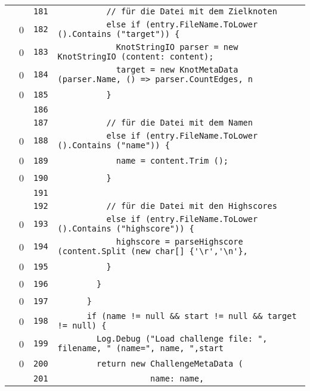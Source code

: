 \documentclass[a4paper,10pt]{article}
\begin{document}
\begin{longtable}[l]{lrrl}
\cellcolor{gray} &  & \verb~181~ & \verb~          // für die Datei mit dem Zielknoten~\\
\cellcolor{red} & 0 & \verb~182~ & \verb~          else if (entry.FileName.ToLower ().Contains ("target")) {~\\
\cellcolor{red} & 0 & \verb~183~ & \verb~            KnotStringIO parser = new KnotStringIO (content: content);~\\
\cellcolor{red} & 0 & \verb~184~ & \verb~            target = new KnotMetaData (parser.Name, () => parser.CountEdges, n~\\
\cellcolor{red} & 0 & \verb~185~ & \verb~          }~\\
\cellcolor{gray} &  & \verb~186~ & \verb~~\\
\cellcolor{gray} &  & \verb~187~ & \verb~          // für die Datei mit dem Namen~\\
\cellcolor{red} & 0 & \verb~188~ & \verb~          else if (entry.FileName.ToLower ().Contains ("name")) {~\\
\cellcolor{red} & 0 & \verb~189~ & \verb~            name = content.Trim ();~\\
\cellcolor{red} & 0 & \verb~190~ & \verb~          }~\\
\cellcolor{gray} &  & \verb~191~ & \verb~~\\
\cellcolor{gray} &  & \verb~192~ & \verb~          // für die Datei mit den Highscores~\\
\cellcolor{red} & 0 & \verb~193~ & \verb~          else if (entry.FileName.ToLower ().Contains ("highscore")) {~\\
\cellcolor{red} & 0 & \verb~194~ & \verb~            highscore = parseHighscore (content.Split (new char[] {'\r','\n'},~\\
\cellcolor{red} & 0 & \verb~195~ & \verb~          }~\\
\cellcolor{red} & 0 & \verb~196~ & \verb~        }~\\
\cellcolor{red} & 0 & \verb~197~ & \verb~      }~\\
\cellcolor{red} & 0 & \verb~198~ & \verb~      if (name != null && start != null && target != null) {~\\
\cellcolor{red} & 0 & \verb~199~ & \verb~        Log.Debug ("Load challenge file: ", filename, " (name=", name, ",start~\\
\cellcolor{red} & 0 & \verb~200~ & \verb~        return new ChallengeMetaData (~\\
\cellcolor{gray} &  & \verb~201~ & \verb~                   name: name,~\\

\end{longtable}
\end{document}
